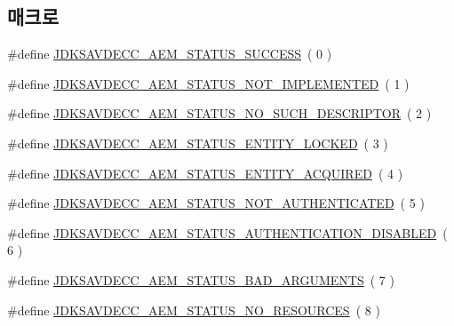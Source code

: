 \subsection*{매크로}
\begin{DoxyCompactItemize}
\item 
\#define \hyperlink{group__aecpdu__aem__status_gaa4d43ea279e119485de1282522a7fb67}{J\+D\+K\+S\+A\+V\+D\+E\+C\+C\+\_\+\+A\+E\+M\+\_\+\+S\+T\+A\+T\+U\+S\+\_\+\+S\+U\+C\+C\+E\+SS}~( 0 )
\item 
\#define \hyperlink{group__aecpdu__aem__status_ga6d2ed160f849781f588b758c2f550f16}{J\+D\+K\+S\+A\+V\+D\+E\+C\+C\+\_\+\+A\+E\+M\+\_\+\+S\+T\+A\+T\+U\+S\+\_\+\+N\+O\+T\+\_\+\+I\+M\+P\+L\+E\+M\+E\+N\+T\+ED}~( 1 )
\item 
\#define \hyperlink{group__aecpdu__aem__status_gaf6f8aee18865b0bda6e684060116e2ab}{J\+D\+K\+S\+A\+V\+D\+E\+C\+C\+\_\+\+A\+E\+M\+\_\+\+S\+T\+A\+T\+U\+S\+\_\+\+N\+O\+\_\+\+S\+U\+C\+H\+\_\+\+D\+E\+S\+C\+R\+I\+P\+T\+OR}~( 2 )
\item 
\#define \hyperlink{group__aecpdu__aem__status_ga2c6ee612969075c4ce0d55b293426e4f}{J\+D\+K\+S\+A\+V\+D\+E\+C\+C\+\_\+\+A\+E\+M\+\_\+\+S\+T\+A\+T\+U\+S\+\_\+\+E\+N\+T\+I\+T\+Y\+\_\+\+L\+O\+C\+K\+ED}~( 3 )
\item 
\#define \hyperlink{group__aecpdu__aem__status_ga44b11fb36a72fe1669a0f6113d2bbb0f}{J\+D\+K\+S\+A\+V\+D\+E\+C\+C\+\_\+\+A\+E\+M\+\_\+\+S\+T\+A\+T\+U\+S\+\_\+\+E\+N\+T\+I\+T\+Y\+\_\+\+A\+C\+Q\+U\+I\+R\+ED}~( 4 )
\item 
\#define \hyperlink{group__aecpdu__aem__status_ga70ebfe8766205c5402bcb9beb0110795}{J\+D\+K\+S\+A\+V\+D\+E\+C\+C\+\_\+\+A\+E\+M\+\_\+\+S\+T\+A\+T\+U\+S\+\_\+\+N\+O\+T\+\_\+\+A\+U\+T\+H\+E\+N\+T\+I\+C\+A\+T\+ED}~( 5 )
\item 
\#define \hyperlink{group__aecpdu__aem__status_ga11ffc82dd78842947956c7268948db4e}{J\+D\+K\+S\+A\+V\+D\+E\+C\+C\+\_\+\+A\+E\+M\+\_\+\+S\+T\+A\+T\+U\+S\+\_\+\+A\+U\+T\+H\+E\+N\+T\+I\+C\+A\+T\+I\+O\+N\+\_\+\+D\+I\+S\+A\+B\+L\+ED}~( 6 )
\item 
\#define \hyperlink{group__aecpdu__aem__status_ga01225ec21c691f662a16ca79f7b12d14}{J\+D\+K\+S\+A\+V\+D\+E\+C\+C\+\_\+\+A\+E\+M\+\_\+\+S\+T\+A\+T\+U\+S\+\_\+\+B\+A\+D\+\_\+\+A\+R\+G\+U\+M\+E\+N\+TS}~( 7 )
\item 
\#define \hyperlink{group__aecpdu__aem__status_ga2346b520560df889f2d1022f238b292f}{J\+D\+K\+S\+A\+V\+D\+E\+C\+C\+\_\+\+A\+E\+M\+\_\+\+S\+T\+A\+T\+U\+S\+\_\+\+N\+O\+\_\+\+R\+E\+S\+O\+U\+R\+C\+ES}~( 8 )
\item 

\end{DoxyCompactItemize}
